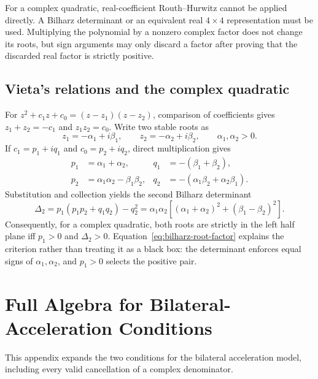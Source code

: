 \documentclass[11pt,a4paper,openany]{book}
\numberwithin{equation}{chapter}
\numberwithin{figure}{chapter}
\numberwithin{table}{chapter}
\newcommand{\chapterguide}[1]{\begin{tcolorbox}[keybox,title=Chapter guide]#1\end{tcolorbox}}
\begin{document}
For a complex quadratic, real-coefficient Routh--Hurwitz cannot be applied directly. A Bilharz determinant or an equivalent real $4\times4$ representation must be used. Multiplying the polynomial by a nonzero complex factor does not change its roots, but sign arguments may only discard a factor after proving that the discarded real factor is strictly positive.

\section{Vieta's relations and the complex quadratic}
For $z^2+c_1z+c_0=(z-z_1)(z-z_2)$, comparison of coefficients gives $z_1+z_2=-c_1$ and $z_1z_2=c_0$. Write two stable roots as
\begin{equation}
z_1=-\alpha_1+i\beta_1,\qquad z_2=-\alpha_2+i\beta_2,\qquad \alpha_1,\alpha_2>0.
\end{equation}
If $c_1=p_1+iq_1$ and $c_0=p_2+iq_2$, direct multiplication gives
\begin{align}
p_1&=\alpha_1+\alpha_2,&q_1&=-(\beta_1+\beta_2),\\
p_2&=\alpha_1\alpha_2-\beta_1\beta_2,&q_2&=-(\alpha_1\beta_2+\alpha_2\beta_1).
\end{align}
Substitution and collection yields the second Bilharz determinant
\begin{equation}
\Delta_2=p_1(p_1p_2+q_1q_2)-q_2^2
=\alpha_1\alpha_2\left[(\alpha_1+\alpha_2)^2+(\beta_1-\beta_2)^2\right].
\label{eq:bilharz-root-factor}
\end{equation}
Consequently, for a complex quadratic, both roots are strictly in the left half plane iff $p_1>0$ and $\Delta_2>0$. Equation~\eqref{eq:bilharz-root-factor} explains the criterion rather than treating it as a black box: the determinant enforces equal signs of $\alpha_1,\alpha_2$, and $p_1>0$ selects the positive pair.

\chapter{Full Algebra for Bilateral-Acceleration Conditions}
\chapterguide{This appendix expands the two conditions for the bilateral acceleration model, including every valid cancellation of a complex denominator.}
\end{document}
